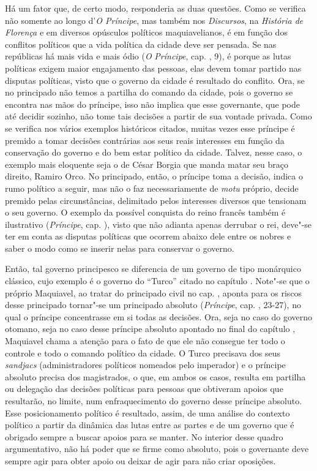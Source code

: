 Há um fator que, de certo modo, responderia as duas questões. Como se
verifica não somente ao longo d'\emph{O Príncipe}, mas também nos
\emph{Discursos}, na \emph{História de Florença} e em diversos opúsculos
políticos maquiavelianos, é em função dos conflitos políticos que a vida
política da cidade deve ser pensada. Se nas repúblicas há mais vida e
mais ódio (\emph{O} \emph{Príncipe}, cap. , 9), é porque as lutas
políticas exigem maior engajamento das pessoas, elas devem tomar partido
nas disputas políticas, visto que o governo da cidade é resultado do
conflito. Ora, se no principado não temos a partilha do comando da
cidade, pois o governo se encontra nas mãos do príncipe, isso não
implica que esse governante, que pode até decidir sozinho, não tome tais
decisões a partir de sua vontade privada. Como se verifica nos vários
exemplos históricos citados, muitas vezes esse príncipe é premido a
tomar decisões contrárias aos seus reais interesses em função da
conservação do governo e do bem estar político da cidade. Talvez, nesse
caso, o exemplo mais eloquente seja o de César Borgia que manda matar
seu braço direito, Ramiro Orco. No principado, então, o príncipe toma a
decisão, indica o rumo político a seguir, mas não o faz necessariamente
de \emph{motu} próprio, decide premido pelas circunstâncias, delimitado
pelos interesses diversos que tensionam o seu governo. O exemplo da
possível conquista do reino francês também é ilustrativo
(\emph{Príncipe}, cap. ), visto que não adianta apenas derrubar o rei,
deve"-se ter em conta as disputas políticas que ocorrem abaixo dele entre
os nobres e saber o modo como se inserir nelas para conservar o governo.

Então, tal governo principesco se diferencia de um governo de tipo
monárquico clássico, cujo exemplo é o governo do ``Turco'' citado no
capítulo . Note"-se que o próprio Maquiavel, ao tratar do principado
civil no cap. , aponta para os riscos desse principado tornar"-se um
principado absoluto (\emph{Príncipe}, cap. , 23-27), no qual o
príncipe concentrasse em si todas as decisões. Ora, seja no caso do
governo otomano, seja no caso desse príncipe absoluto apontado no final
do capítulo , Maquiavel chama a atenção para o fato de que ele não
consegue ter todo o controle e todo o comando político da cidade. O
Turco precisava dos seus \emph{sandjacs} (administradores políticos
nomeados pelo imperador) e o príncipe absoluto precisa dos magistrados,
o que, em ambos os casos, resulta em partilha ou delegação das decisões
políticas para pessoas que obtiveram apoios que resultarão, no limite,
num enfraquecimento do governo desse príncipe absoluto. Esse
posicionamento político é resultado, assim, de uma análise do contexto
político a partir da dinâmica das lutas entre as partes e de um governo
que é obrigado sempre a buscar apoios para se manter. No interior desse
quadro argumentativo, não há poder que se firme como absoluto, pois o
governante deve sempre agir para obter apoio ou deixar de agir para não
criar oposições.

